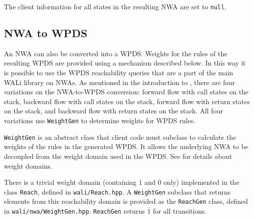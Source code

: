 The client information for all states in the resulting NWA are set to \texttt{null}.


\subsection{NWA to WPDS}
\label{Se:NWAtoPDS}


An NWA can also be converted into a WPDS. Weights for the rules of the
resulting WPDS are provided using a mechanism described below.  In this way
it is possible to use
the WPDS reachability queries that are a part of the main WALi library on
NWAs.  As mentioned in the introduction to , there are
four variations on the NWA-to-WPDS conversion: forward flow with call states
on the stack, backward flow with call states on the stack, forward flow with
return states on the stack, and backward flow with return states on the
stack. All four variations use \texttt{WeightGen} to determine weights for
WPDS rules.

\texttt{WeightGen} is an abstract class that client code must subclass to
calculate the weights of the rules in the generated WPDS.  It allows the
underlying NWA to be decoupled from the weight domain used in the WPDS.  See
\cite[\S4-\S5]{wali} for details about weight domains.

There is a trivial weight domain (containing $\overline{1}$ and
$\overline{0}$ only) implemented in the class \texttt{Reach}, defined in
\texttt{wali/Reach.hpp}. A \texttt{WeightGen} subclass that returns elements
from this reachability domain is provided as the \texttt{ReachGen} class,
defined in \texttt{wali/nwa/WeightGen.hpp}. \texttt{ReachGen} returns
$\overline{1}$ for all transitions.


